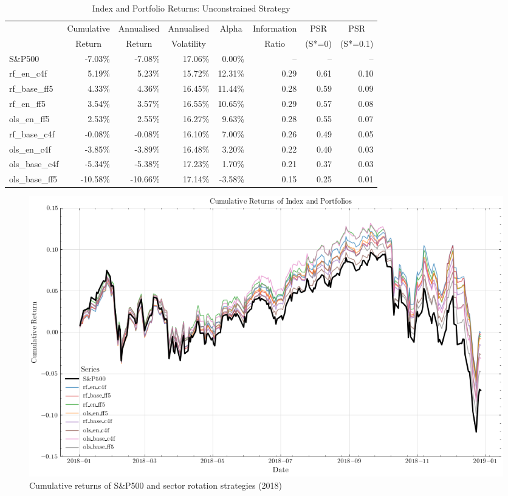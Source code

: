 \begin{table}[H]
\centering
\caption{Index and Portfolio Returns: Unconstrained Strategy}
\label{tab:unconstr}
\begin{tabular}{lrrrrrrr}
\toprule
{} & \multicolumn{1}{c}{Cumulative} & \multicolumn{1}{c}{Annualised} & \multicolumn{1}{c}{Annualised} & \multicolumn{1}{c}{Alpha} & \multicolumn{1}{c}{Information} & \multicolumn{1}{c}{PSR} & \multicolumn{1}{c}{PSR} \\
{} & \multicolumn{1}{c}{Return} & \multicolumn{1}{c}{Return} & \multicolumn{1}{c}{Volatility} & {} & \multicolumn{1}{c}{Ratio} & \multicolumn{1}{c}{(S*=0)} & \multicolumn{1}{c}{(S*=0.1)} \\
\midrule
S\&P500 & -7.03\% & -7.08\% & 17.06\% & 0.00\% & -- & -- & -- \\
rf\_en\_c4f & 5.19\% & 5.23\% & 15.72\% & 12.31\% & 0.29 & 0.61 & 0.10 \\
rf\_base\_ff5 & 4.33\% & 4.36\% & 16.45\% & 11.44\% & 0.28 & 0.59 & 0.09 \\
rf\_en\_ff5 & 3.54\% & 3.57\% & 16.55\% & 10.65\% & 0.29 & 0.57 & 0.08 \\
ols\_en\_ff5 & 2.53\% & 2.55\% & 16.27\% & 9.63\% & 0.28 & 0.55 & 0.07 \\
rf\_base\_c4f & -0.08\% & -0.08\% & 16.10\% & 7.00\% & 0.26 & 0.49 & 0.05 \\
ols\_en\_c4f & -3.85\% & -3.89\% & 16.48\% & 3.20\% & 0.22 & 0.40 & 0.03 \\
ols\_base\_c4f & -5.34\% & -5.38\% & 17.23\% & 1.70\% & 0.21 & 0.37 & 0.03 \\
ols\_base\_ff5 & -10.58\% & -10.66\% & 17.14\% & -3.58\% & 0.15 & 0.25 & 0.01 \\
\bottomrule
\end{tabular}
\end{table}

\begin{figure}[H]
    \centering
    \includegraphics[width=\textwidth]{plots/results/contrained_cum_ret_plot.png}
    \caption{Cumulative returns of S\&P500 and sector rotation strategies (2018)}\label{fig:constr_cum_ret_plot}
\end{figure}

